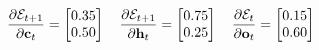 \documentclass[xcolor={table}]{beamer}
\begin{document}
 \begin{frame} 
\begin{equation*}
\frac{\partial \mathcal{E}_{t{+}1}}{\partial \mathbf{c}_t}=\begin{bmatrix} 0.35 \\ 0.50 \end{bmatrix} \quad
\frac{\partial \mathcal{E}_{t{+}1}}{\partial \mathbf{h}_t}=\begin{bmatrix} 0.75 \\ 0.25\end{bmatrix} \quad
\frac{\partial \mathcal{E}_{t}}{\partial \mathbf{o}_t}=\begin{bmatrix} 0.15 \\ 0.60\end{bmatrix} \notag
\end{equation*}
\end{frame} 
\end{document}
